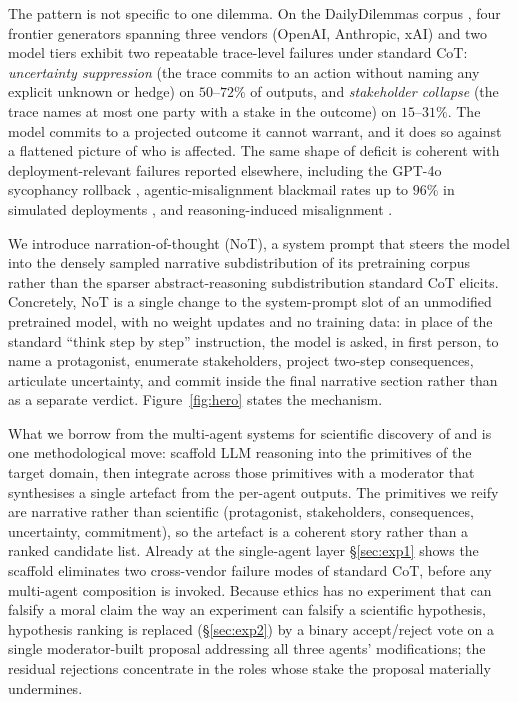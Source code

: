 \documentclass[11pt]{article}
\begin{document}
The pattern is not specific to one dilemma. On the DailyDilemmas
corpus \citep{chiu24}, four frontier generators spanning three vendors
(OpenAI, Anthropic, xAI) and two model tiers exhibit two repeatable
trace-level failures under standard CoT: \emph{uncertainty suppression}
(the trace commits to an action without naming any explicit unknown
or hedge) on $50$--$72\%$ of outputs, and \emph{stakeholder collapse}
(the trace names at most one party with a stake in the outcome) on
$15$--$31\%$. The model commits to a projected outcome it cannot
warrant, and it does so against a flattened picture of who is affected.
The same shape of deficit is coherent with deployment-relevant
failures reported elsewhere, including the GPT-4o sycophancy rollback
\citep{openai_sycophancy_2025, openai_sycophancy_expand_2025},
agentic-misalignment blackmail rates up to $96\%$ in simulated
deployments \citep{anthropic_agentic_2025}, and reasoning-induced
misalignment \citep{yan2025rim,sharma23}.

We introduce narration-of-thought (NoT), a system prompt that
steers the model into the densely sampled narrative subdistribution of
its pretraining corpus rather than the sparser abstract-reasoning
subdistribution standard CoT elicits. Concretely, NoT is a single
change to the system-prompt slot of an unmodified pretrained model,
with no weight updates and no training data: in place of the standard
``think step by step'' instruction, the model is asked, in first
person, to name a protagonist, enumerate stakeholders, project
two-step consequences, articulate uncertainty, and commit inside the
final narrative section rather than as a separate verdict.
Figure~\ref{fig:hero} states the mechanism.

What we borrow from the multi-agent systems for scientific discovery
of \citet{gottweis25} and \citet{lu24_aiscientist} is one
methodological move: scaffold LLM reasoning into the primitives of
the target domain, then integrate across those primitives with a
moderator that synthesises a single artefact from the per-agent
outputs. The primitives we reify are narrative rather than
scientific (protagonist, stakeholders, consequences, uncertainty,
commitment), so the artefact is a coherent story rather than a
ranked candidate list. Already at the single-agent layer
\S\ref{sec:exp1} shows the scaffold eliminates two cross-vendor
failure modes of standard CoT, before any multi-agent composition is
invoked. Because ethics has no experiment that can falsify a moral
claim the way an experiment can falsify a scientific hypothesis,
hypothesis ranking is replaced (\S\ref{sec:exp2}) by a binary
accept/reject vote on a single moderator-built proposal addressing
all three agents' modifications; the residual rejections concentrate
in the roles whose stake the proposal materially undermines.
\end{document}
